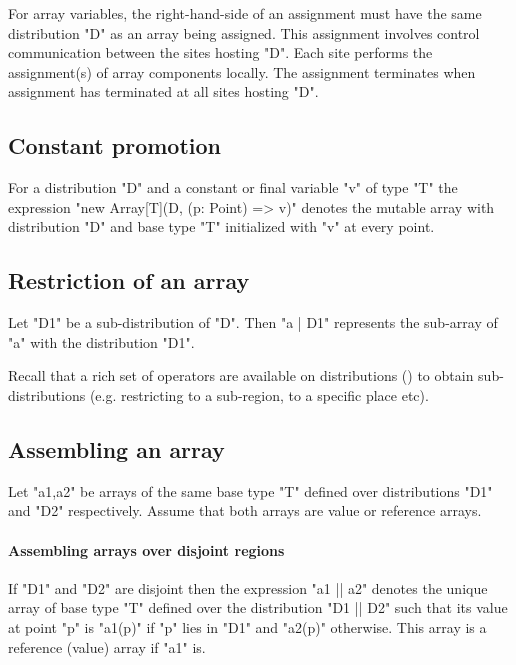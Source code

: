 For array variables, the right-hand-side of an assignment must
have the same distribution \xcd"D" as an array being assigned. This
assignment involves
control communication between the sites hosting \xcd"D". Each
site performs the assignment(s) of array components locally. The
assignment terminates when assignment has terminated at all
sites hosting \xcd"D".

\subsection{Constant promotion}\label{ConstantArray}

For a distribution \xcd"D" and a constant or final variable \xcd"v" of
type \xcd"T" the expression \xcd"new Array[T](D, (p: Point) => v)"
denotes the mutable array with
distribution \xcd"D" and base type \xcd"T" initialized with \xcd"v"
at every point.

\subsection{Restriction of an array}

Let \xcd"D1" be a sub-distribution of \xcd"D". Then \xcd"a | D1"
represents the sub-array of \xcd"a" with the distribution \xcd"D1".

Recall that a rich set of operators are available on distributions
() to obtain sub-distributions
(e.g. restricting to a sub-region, to a specific place etc).

\subsection{Assembling an array}
Let \xcd"a1,a2" be arrays of the same base type \xcd"T" defined over
distributions \xcd"D1" and \xcd"D2" respectively. Assume that both
arrays are value or reference arrays. 
\paragraph{Assembling arrays over disjoint regions}

If \xcd"D1" and \xcd"D2" are disjoint then the expression \xcd"a1 || a2" denotes the unique array of base type \xcd"T" defined over the
distribution \xcd"D1 || D2" such that its value at point \xcd"p" is
\xcd"a1(p)" if \xcd"p" lies in \xcd"D1" and \xcd"a2(p)"
otherwise. This array is a reference (value) array if \xcd"a1" is.

